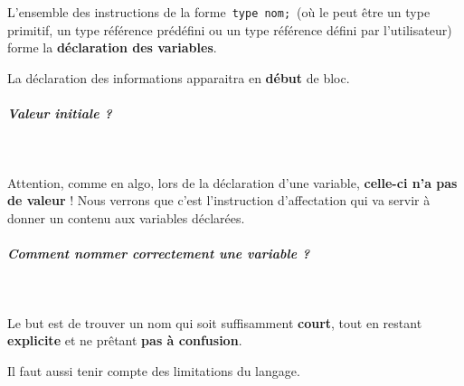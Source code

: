 \documentclass[11pt,a4paper]{article}
\begin{document}
          L'ensemble des instructions de la forme \,\verb|type nom;|\,
          (o\`u le \verb@type@ peut \^etre un type primitif, un type r\'ef\'erence pr\'ed\'efini ou un type r\'ef\'erence d\'efini par l'utilisateur) 
          forme la \textbf{d\'eclaration des variables}. 
        
            \par
        
          La d\'eclaration des informations apparaitra en \textbf{d\'ebut} de bloc.
        
            \par
        
			
		\subparagraph{Valeur initiale ?} 
		
					\textcolor{white}{.} \par
				
            \par
        
          Attention, comme en algo, lors de la d\'eclaration d'une variable, \textbf{celle-ci n'a pas de valeur} ! 
          Nous verrons que c'est l'instruction d'affectation qui va servir \`a donner un contenu aux variables d\'eclar\'ees.
        
            \par
        
			
		\subparagraph{Comment nommer correctement une variable ?} 
		
					\textcolor{white}{.} \par
				
            \par
        
          Le but est de trouver un nom qui soit suffisamment \textbf{court}, 
          tout en restant \textbf{explicite} et ne pr\^etant \textbf{pas \`a confusion}.
        
            \par
        
          Il faut aussi tenir compte des limitations du langage.
          
\end{document}
